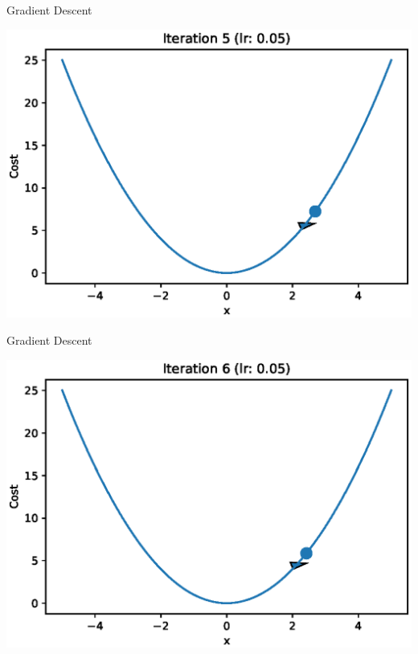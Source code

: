 \documentclass{beamer}
\begin{document}
	\begin{frame}{Gradient Descent}
		\begin{center}
			\includegraphics[totalheight=6cm]{gradient-descent/iteration-5.eps}
		\end{center}
	\end{frame}
	
	\begin{frame}{Gradient Descent}
		\begin{center}
			\includegraphics[totalheight=6cm]{gradient-descent/iteration-6.eps}
		\end{center}
	\end{frame}
	
\end{document}

